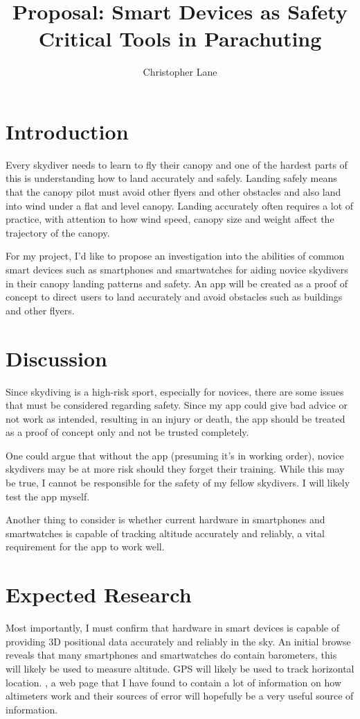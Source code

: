 \documentclass{article}
\title{Proposal: Smart Devices as Safety Critical Tools in Parachuting}
\author{Christopher Lane}
\begin{document}
\maketitle

\section{Introduction}
Every skydiver needs to learn to fly their canopy and one of the hardest parts of this is understanding how to land accurately and safely. Landing safely means that the canopy pilot must avoid other flyers and other obstacles and also land into wind under a flat and level canopy. Landing accurately often requires a lot of practice, with attention to how wind speed, canopy size and weight affect the trajectory of the canopy.

For my project, I'd like to propose an investigation into the abilities of common smart devices such as smartphones and smartwatches for aiding novice skydivers in their canopy landing patterns and safety. An app will be created as a proof of concept to direct users to land accurately and avoid obstacles such as buildings and other flyers.

\section{Discussion}
Since skydiving is a high-risk sport, especially for novices, there are some issues that must be considered regarding safety. Since my app could give bad advice or not work as intended, resulting in an injury or death, the app should be treated as a proof of concept only and not be trusted completely.

One could argue that without the app (presuming it's in working order), novice skydivers may be at more risk should they forget their training. While this may be true, I cannot be responsible for the safety of my fellow skydivers. I will likely test the app myself.

Another thing to consider is whether current hardware in smartphones and smartwatches is capable of tracking altitude accurately and reliably, a vital requirement for the app to work well.

\newpage\section{Expected Research}

Most importantly, I must confirm that hardware in smart devices is capable of providing 3D positional data accurately and reliably in the sky. An initial browse reveals that many smartphones and smartwatches do contain barometers, this will likely be used to measure altitude. GPS will likely be used to track horizontal location. \autocite{alti}, a web page that I have found to contain a lot of information on how altimeters work and their sources of error will hopefully be a very useful source of information.
\end{document}
